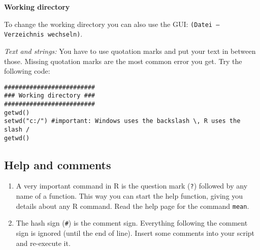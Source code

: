 \documentclass{article}
\begin{document}
\begin{solution}
\textbf{Working directory}

To change the working directory you can also use the GUI: \texttt{(Datei -- Verzeichnis wechseln)}.

\emph{Text and strings:} You have to use quotation marks and put your text in between those. Missing quotation marks are the most common error you get. Try the following code:
\begin{verbatim}
#########################
### Working directory ###
#########################
getwd()
setwd("c:/") #important: Windows uses the backslash \, R uses the slash /
getwd()
\end{verbatim}
\end{solution}

\subsection{Help and comments}

\begin{enumerate}
\item A very important command in R is the question mark (\texttt{?}) followed by any name of a function. This way you can start the help function, giving you details about any R command. Read the help page for the command \texttt{mean}.

\item The hash sign (\texttt{\#}) is the comment sign. Everything following the comment sign is ignored (until the end of line). Insert some comments into your script and re-execute it.
\end{enumerate}
\end{document}
